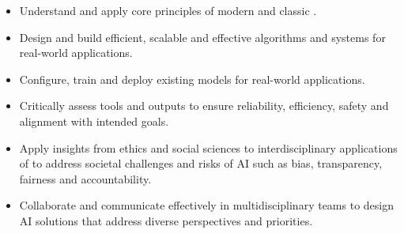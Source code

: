 

\begin{itemize}
        \item Understand and apply core principles of modern and classic \ai{}.

        \item Design and build efficient, scalable and effective algorithms and systems for real-world applications.

        \item Configure, train and deploy existing models for real-world applications.

        \item Critically assess \ai{} tools and outputs to ensure reliability, efficiency, safety and alignment with intended goals.

        \item Apply insights from ethics and social sciences to interdisciplinary applications of \ai{} to address societal challenges and risks of AI such as bias, transparency, fairness and accountability. 

        \item Collaborate and communicate effectively in multidisciplinary teams to design AI solutions that address diverse perspectives and priorities.
\end{itemize} 